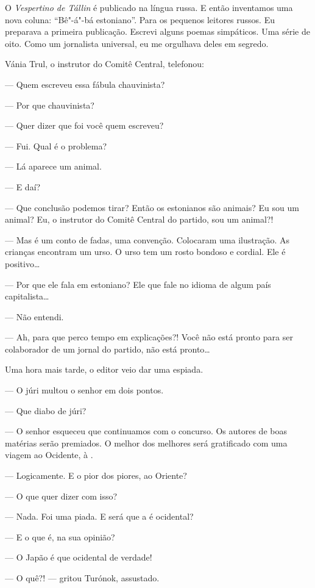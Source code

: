 O \emph{Vespertino de Tállin} é publicado na língua russa. E então
inventamos uma nova coluna: ``Bê"-á"-bá estoniano''. Para os pequenos
leitores russos. Eu preparava a primeira publicação. Escrevi alguns
poemas simpáticos. Uma série de oito. Como um jornalista universal, eu
me orgulhava deles em segredo.

Vánia Trul, o instrutor do Comitê Central, telefonou:

--- Quem escreveu essa fábula chauvinista?

--- Por que chauvinista?

--- Quer dizer que foi você quem escreveu?

--- Fui. Qual é o problema?

--- Lá aparece um animal.

--- E daí?

--- Que conclusão podemos tirar? Então os estonianos são animais? Eu sou
um animal? Eu, o instrutor do Comitê Central do partido, sou um animal?!

--- Mas é um conto de fadas, uma convenção. Colocaram uma ilustração. As
crianças encontram um urso. O urso tem um rosto bondoso e cordial. Ele é
positivo\ldots{}

--- Por que ele fala em estoniano? Ele que fale no idioma de algum país
capitalista\ldots{}

--- Não entendi.

--- Ah, para que perco tempo em explicações?! Você não está pronto para
ser colaborador de um jornal do partido, não está pronto\ldots{}

Uma hora mais tarde, o editor veio dar uma espiada.

--- O júri multou o senhor em dois pontos.

--- Que diabo de júri?

--- O senhor esqueceu que continuamos com o concurso. Os autores de boas
matérias serão premiados. O melhor dos melhores será gratificado com uma
viagem ao Ocidente, à .

--- Logicamente. E o pior dos piores, ao Oriente?

--- O que quer dizer com isso?

--- Nada. Foi uma piada. E será que a  é ocidental?

--- E o que é, na sua opinião?

--- O Japão é que ocidental de verdade!

--- O quê?! --- gritou Turónok, assustado.

